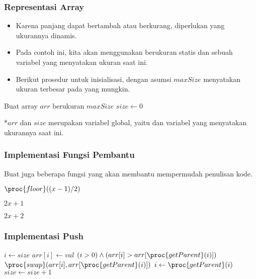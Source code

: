 \begin{frame}
\frametitle{Representasi Array}
\begin{itemize}
  \item Karena panjang \farray dapat bertambah atau berkurang, diperlukan \farray yang ukurannya dinamis.
  \item Pada contoh ini, kita akan menggunakan \farray berukuran statis dan sebuah variabel yang menyatakan ukuran \farray saat ini.
  \item Berikut prosedur untuk inisialisasi, dengan asumsi $maxSize$ menyatakan ukuran terbesar pada \pheap yang mungkin.
\end{itemize}
\begin{codebox}
\li \Comment Buat array $arr$ berukuran $maxSize$
\li $size \gets 0$
\end{codebox}
*$arr$ dan $size$ merupakan variabel global, yaitu \farray dan variabel yang menyatakan ukurannya saat ini.
\end{frame}

\begin{frame}
\frametitle{Implementasi Fungsi Pembantu}
Buat juga beberapa fungsi yang akan membantu mempermudah penulisan kode.
\begin{codebox}
\li \Return $\proc{floor}((x-1) / 2)$
\end{codebox}

\begin{codebox}
\li \Return $2x + 1$
\end{codebox}

\begin{codebox}
\li \Return $2x + 2$
\end{codebox}
\end{frame}

\begin{frame}
\frametitle{Implementasi Push}
\begin{codebox}
\li $i \gets size$
\li $arr[i] \gets val$
\li \While $(i > 0) \land (arr[i] > arr[\proc{getParent}(i)])$  \Do
\li   $\proc{swap}(arr[i], arr[\proc{getParent}(i)])$
\li   $i \gets \proc{getParent}(i)$
    \End
\li $size \gets size + 1$
\end{codebox}
\end{frame}

